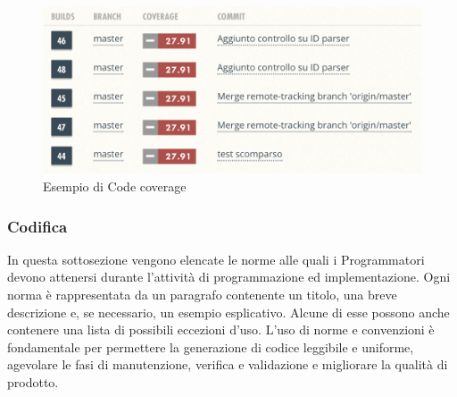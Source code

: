     	\begin{figure}[!htbp]
		    \centering
		    \includegraphics{CruscottoInformativoCoveralls.png}
		    \caption{Esempio di Code coverage}
	    \end{figure}
	\clearpage
	    \subsubsection{Codifica}
	In  questa  sottosezione  vengono  elencate  le  norme   alle  quali  i  Programmatori  devono attenersi durante l’attività di programmazione ed implementazione. Ogni  norma è  rappresentata  da  un  paragrafo contenente un titolo,  una breve descrizione e, se necessario, un esempio esplicativo.  Alcune di esse possono anche contenere una lista di possibili eccezioni d’uso. L’uso di norme e convenzioni è fondamentale per permettere la generazione di codice leggibile e uniforme, agevolare le fasi di manutenzione,  verifica e validazione e migliorare la qualità di prodotto. \newline
